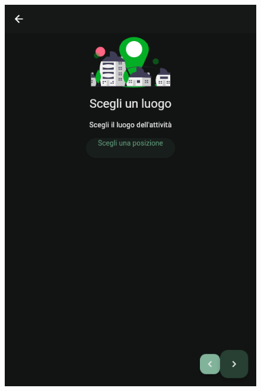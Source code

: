 \documentclass[a4paper,12pt]{article}
\begin{document}
\begin{figure}[H]
    \begin{minipage}{0.32\textwidth}
        \centering
        \includegraphics[width=1\linewidth]{img/new_pos.png}
    \end{minipage}
    \begin{minipage}{0.32\textwidth}
        \centering

\end{minipage}
\end{figure}
\end{document}
